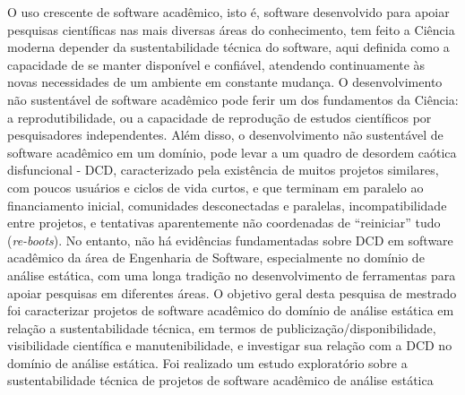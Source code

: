 O uso crescente de software acadêmico, isto é, software desenvolvido para apoiar pesquisas
científicas nas mais diversas áreas do conhecimento,
tem feito a Ciência moderna depender da sustentabilidade técnica do software,
aqui definida como a capacidade de se manter disponível e confiável, %
atendendo continuamente às novas necessidades de um ambiente %
em constante mudança.
O desenvolvimento não sustentável de software acadêmico pode 
ferir um dos fundamentos da Ciência:
a reprodutibilidade, %
ou a capacidade de reprodução de estudos científicos por pesquisadores independentes. 
Além disso, o desenvolvimento não sustentável de software acadêmico em um domínio,
pode levar a um quadro de desordem caótica disfuncional - DCD,
caracterizado pela existência de muitos projetos similares, com poucos
usuários e ciclos de vida curtos, e que terminam em paralelo ao financiamento
inicial,  comunidades desconectadas e paralelas, incompatibilidade entre
projetos, e tentativas aparentemente não coordenadas de ``reiniciar'' tudo
({\it re-boots}).
No entanto, não há evidências fundamentadas sobre DCD em software
acadêmico da área de Engenharia de Software, especialmente
no domínio de análise estática, com uma longa tradição no
desenvolvimento de ferramentas para apoiar pesquisas em diferentes áreas.
O objetivo geral desta pesquisa de mestrado foi caracterizar projetos de software acadêmico
do domínio de análise estática em relação a sustentabilidade técnica, em termos
de publicização/disponibilidade, visibilidade
científica e manutenibilidade,
e investigar sua relação com a DCD no domínio de análise estática.
Foi realizado um estudo exploratório sobre a sustentabilidade
técnica de projetos de software acadêmico de análise estática 
